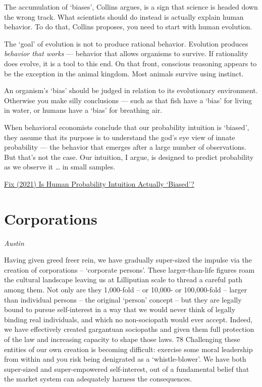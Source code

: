 \documentclass[
]{book}
\begin{document}
The accumulation of `biases', Collins argues, is a sign that science is headed down the wrong track. What scientists should do instead is actually explain human behavior. To do that, Collins proposes, you need to start with human evolution.

The `goal' of evolution is not to produce rational behavior. Evolution produces \emph{behavior that works} --- behavior that allows organisms to survive. If rationality does evolve, it is a tool to this end. On that front, conscious reasoning appears to be the exception in the animal kingdom. Most animals survive using instinct.

An organism's `bias' should be judged in relation to its evolutionary environment. Otherwise you make silly conclusions --- such as that fish have a `bias' for living in water, or humans have a `bias' for breathing air.

When behavioral economists conclude that our probability intuition is `biased', they assume that its purpose is to understand the god's eye view of innate probability --- the behavior that emerges after a large number of observations. But that's not the case. Our intuition, I argue, is designed to predict probability as we observe it \ldots{} in small samples.

\href{https://economicsfromthetopdown.com/2021/07/09/is-human-probability-intuition-actually-biased/}{Fix (2021) Is Human Probability Intuition Actually `Biased'?}

\hypertarget{corporations}{%
\chapter{Corporations}\label{corporations}}

\emph{Austin}

Having given greed freer rein, we have gradually super-sized the impulse via the creation of
corporations -- `corporate persons'. These larger-than-life figures roam the cultural landscape
leaving us at Lilliputian scale to thread a careful path among them. Not only are they 1,000-fold -- or
10,000- or 100,000-fold -- larger than individual persons -- the original `person' concept -- but they
are legally bound to pursue self-interest in a way that we would never think of legally binding real
individuals, and which no non-sociopath would ever accept. Indeed, we have effectively created
gargantuan sociopaths and given them full protection of the law and increasing capacity to shape
those laws. 78 Challenging these entities of our own creation is becoming difficult: exercise some
moral leadership from within and you risk being denigrated as a `whistle-blower'. We have both
super-sized and super-empowered self-interest, out of a fundamental belief that the market system
can adequately harness the consequences.
\end{document}
